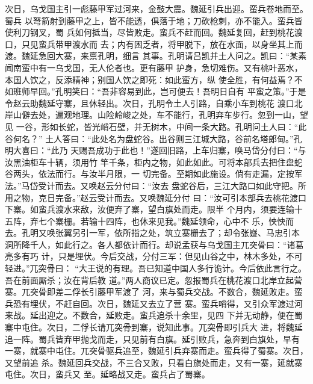 次日，乌戈国主引一彪藤甲军过河来，金鼓大震。魏延引兵出迎。蛮兵卷地而至。蜀兵
以弩箭射到藤甲之上，皆不能透，俱落于地；刀砍枪刺，亦不能入。蛮兵皆使利刀钢叉，蜀
兵如何抵当，尽皆败走。蛮兵不赶而回。魏延复回，赶到桃花渡口，只见蛮兵带甲渡水而
去；内有困乏者，将甲脱下，放在水面，以身坐其上而渡。魏延急回大寨，来禀孔明，细言
其事。孔明请吕凯并土人问之。凯曰：“某素闻南蛮中有一乌戈国，无人伦者也。更有藤甲
护身，急切难伤。又有桃叶恶水，本国人饮之，反添精神；别国人饮之即死：如此蛮方，纵
使全胜，有何益焉？不如班师早回。”孔明笑曰：“吾非容易到此，岂可便去！吾明日自有
平蛮之策。”于是令赵云助魏延守寨，且休轻出。次日，孔明令土人引路，自乘小车到桃花
渡口北岸山僻去处，遍观地理。山险岭峻之处，车不能行，孔明弃车步行。忽到一山，望见
一谷，形如长蛇，皆光峭石壁，并无树木，中间一条大路。孔明问土人曰：“此谷何名？”
土人答曰：“此处名为盘蛇谷。出谷则三江城大路，谷前名塔郎甸。”孔明大喜曰：“此乃
天赐吾成功于此也！”遂回旧路，上车归寨，唤马岱分付曰：“与汝黑油柜车十辆，须用竹
竿千条，柜内之物，如此如此。可将本部兵去把住盘蛇谷两头，依法而行。与汝半月限，一
切完备。至期如此施设。倘有走漏，定按军法。”马岱受计而去。又唤赵云分付曰：“汝去
盘蛇谷后，三江大路口如此守把。所用之物，克日完备。”赵云受计而去。又唤魏延分付
曰：“汝可引本部兵去桃花渡口下寨。如蛮兵渡水来敌，汝便弃了寨，望白旗处而走。限半
个月内，须要连输十五阵，弃七个寨栅。若输十四阵，也休来见我。”魏延领命，心中不
乐，怏怏而去。孔明又唤张翼另引一军，依所指之处，筑立寨栅去了；却令张嶷、马忠引本
洞所降千人，如此行之。各人都依计而行。却说孟获与乌戈国主兀突骨曰：“诸葛亮多有巧
计，只是埋伏。今后交战，分付三军：但见山谷之中，林木多处，不可轻进。”兀突骨曰：
“大王说的有理。吾已知道中国人多行诡计。今后依此言行之。吾在前面厮杀；汝在背后教
道。”两人商议已定。忽报蜀兵在桃花渡口北岸立起营寨。兀突骨即差二俘长引藤甲军渡了
河，来与蜀兵交战。不数合，魏延败走。蛮兵恐有埋伏，不赶自回。次日，魏延又去立了营
寨。蛮兵哨得，又引众军渡过河来战。延出迎之。不数合，延败走。蛮兵追杀十余里，见四
下并无动静，便在蜀寨中屯住。次日，二俘长请兀突骨到寨，说知此事。兀突骨即引兵大
进，将魏延追一阵。蜀兵皆弃甲抛戈而走，只见前有白旗。延引败兵，急奔到白旗处，早有
一寨，就寨中屯住。兀突骨驱兵追至，魏延引兵弃寨而走。蛮兵得了蜀寨。次日，又望前追
杀。魏延回兵交战，不三合又败，只看白旗处而走，又有一寨，延就寨屯住。次日，蛮兵又
至。延略战又走。蛮兵占了蜀寨。

